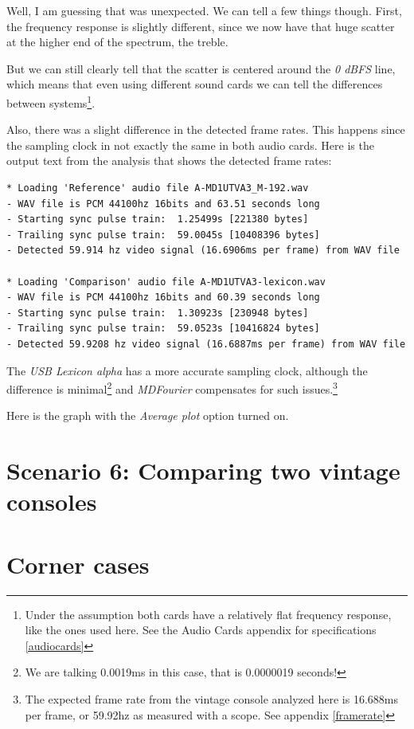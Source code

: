 \documentclass[10pt,a4paper]{report}
\begin{document}
Well, I am guessing that was unexpected. We can tell a few things though. First, the frequency response is slightly different, since we now have that huge scatter at the higher end of the spectrum, the treble.

But we can still clearly tell that the scatter is centered around the \textit{0 dBFS} line, which means that even using different sound cards we can tell the differences between systems\footnote{Under the assumption both cards have a relatively flat frequency response, like the ones used here. See the Audio Cards appendix for specifications \ref{audiocards}}. 

Also, there was a slight difference in the detected frame rates. This happens since the sampling clock in not exactly the same in both audio cards. Here is the output text from the analysis that shows the detected frame rates:

\begin{verbatim}
* Loading 'Reference' audio file A-MD1UTVA3_M-192.wav
- WAV file is PCM 44100hz 16bits and 63.51 seconds long
- Starting sync pulse train:  1.25499s [221380 bytes]
- Trailing sync pulse train:  59.0045s [10408396 bytes]
- Detected 59.914 hz video signal (16.6906ms per frame) from WAV file

* Loading 'Comparison' audio file A-MD1UTVA3-lexicon.wav
- WAV file is PCM 44100hz 16bits and 60.39 seconds long
- Starting sync pulse train:  1.30923s [230948 bytes]
- Trailing sync pulse train:  59.0523s [10416824 bytes]
- Detected 59.9208 hz video signal (16.6887ms per frame) from WAV file
\end{verbatim}

The \textit{USB Lexicon alpha} has a more accurate sampling clock, although the difference is minimal\footnote{We are talking 0.0019ms in this case, that is 0.0000019 seconds!} and \textit{MDFourier} compensates for such issues.\footnote{The expected frame rate from the vintage console analyzed here is 16.688ms per frame, or 59.92hz as measured with a scope. See appendix \ref{framerate}}

Here is the graph with the \textit{Average plot} option turned on.



\section{Scenario 6: Comparing two vintage consoles}

\section{Corner cases}
\label{cornercase}
\end{document}
